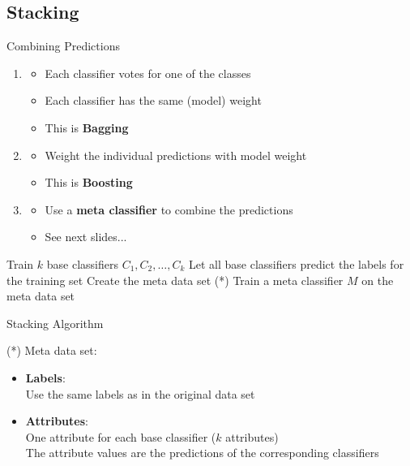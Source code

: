 \subsection{Stacking}

\begin{frame}{Combining Predictions}{}
	\begin{enumerate}
		\item {} \checkmark
		\begin{itemize}
			\item Each classifier votes for one of the classes
			\item Each classifier has the same (model) weight
			\item This is \textbf{Bagging}
		\end{itemize}
		\item {} \checkmark
		\begin{itemize}
			\item Weight the individual predictions with model weight
			\item This is \textbf{Boosting}
		\end{itemize}
		\item {}
		\begin{itemize}
			\item Use a \textbf{meta classifier} to combine the predictions
			\item See next slides...
		\end{itemize}
	\end{enumerate}
\end{frame}


\begin{frame}[plain]{}{}
	\begin{algorithm}[H]
		\DontPrintSemicolon
		\footnotesize
		Train $k$ base classifiers $C_1, C_2, \dots, C_k$\;
		Let all base classifiers predict the labels for the training set\;
		Create the meta data set (*)\;
		Train a meta classifier $M$ on the meta data set\;
 		\caption{Stacking Algorithm}
	\end{algorithm}
	
	\vspace*{5mm}
	\footnotesize
	(*) Meta data set:\;
	\begin{itemize}
		\item \textbf{Labels}: \\
			Use the same labels as in the original data set
		\item \textbf{Attributes}: \\
			One attribute for each base classifier ($k$ attributes) \\
			The attribute values are the predictions of the corresponding classifiers
	\end{itemize}
\end{frame}


